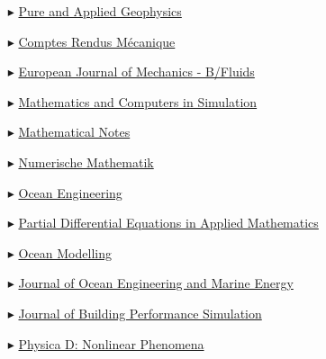 \begin{itemize}
    \item[$\blacktriangleright$] \href{https://www.springer.com/journal/24}%
    {Pure and Applied Geophysics}
    
    \item[$\blacktriangleright$] \href{http://www.sciencedirect.com/science/journal/16310721}%
    {Comptes Rendus M\'ecanique}
    
    \item[$\blacktriangleright$]  \href{http://www.elsevier.com/wps/find/journaldescription.cws_home/600738/description}%
    {European Journal of Mechanics - B/Fluids}
    
    \item[$\blacktriangleright$] \href{http://www.elsevier.com/wps/find/journaldescription.cws_home/505615/description#description}%
    {Mathematics and Computers in Simulation}

    \item[$\blacktriangleright$] \href{https://link.springer.com/journal/11006/}{Mathematical Notes}
    
    \item[$\blacktriangleright$] \href{http://www.springerlink.com/content/100497/}%
    {Numerische Mathematik}
    
    \item[$\blacktriangleright$] \href{http://www.journals.elsevier.com/ocean-engineering/}%
    {Ocean Engineering}

    \item[$\blacktriangleright$] \href{https://www.sciencedirect.com/journal/partial-differential-equations-in-applied-mathematics/}{Partial Differential Equations in Applied Mathematics}
    
    \item[$\blacktriangleright$] \href{http://www.elsevier.com/wps/find/journaldescription.cws_home/601376/description#description}%
    {Ocean Modelling}
    
    \item[$\blacktriangleright$] \href{http://www.springer.com/engineering/civil+engineering/journal/40722/}{Journal of Ocean Engineering and Marine Energy}
    
    \item[$\blacktriangleright$] \href{https://www.tandfonline.com/toc/tbps20/current/}{Journal of Building Performance Simulation}

    \item[$\blacktriangleright$] \href{https://www.sciencedirect.com/journal/physica-d-nonlinear-phenomena/}{Physica D: Nonlinear Phenomena}
    

\end{itemize}
